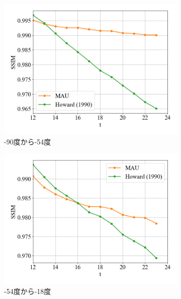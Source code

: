           \begin{figure}[htbp]
            \begin{subfigure}{0.5\textwidth}
              \centering
              \includegraphics[width=\textwidth]{figures/exp1/lng_ssim_1.png}
              \caption{-90度から-54度}
            \end{subfigure}
            \begin{subfigure}{0.5\textwidth}
              \centering
              \includegraphics[width=\textwidth]{figures/exp1/lng_ssim_2.png}
              \caption{-54度から-18度}
            \end{subfigure} \par
            \begin{subfigure}{0.5\textwidth}

\end{subfigure}
\end{figure}
